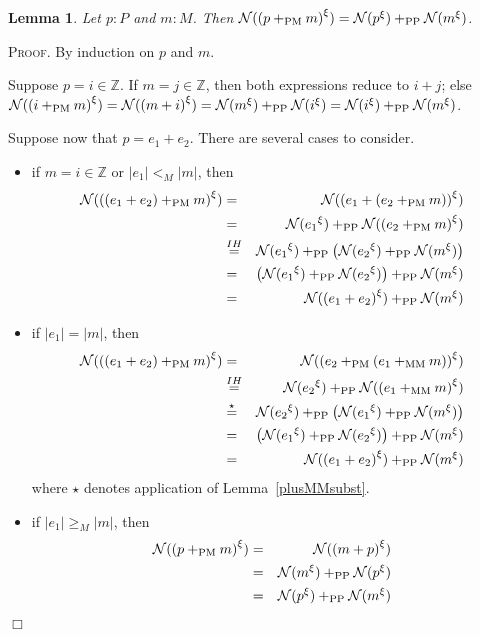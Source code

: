 \documentclass{article}
\newtheorem{lemma}[definition]{Lemma}
\newenvironment{proof}{\smallskip\textsc{Proof.}}{\hspace*{\fill}$\Box$}
\newcommand{\N}{{\cal N}}
\newcommand{\Z}{{\mathbb Z}}
\newcommand{\renamevar}[2]{\ensuremath{{#1}^{#2}}}
\newcommand{\plusMM}{\ensuremath{+_{\mathrm{MM}}}}
\newcommand{\plusPM}{\ensuremath{+_{\mathrm{PM}}}}
\newcommand{\plusPP}{\ensuremath{+_{\mathrm{PP}}}}
\begin{document}
\begin{lemma}\label{plusPMsubst} Let $p:P$ and $m:M$.  Then
$\N(\renamevar{(p\plusPM m)}\xi)%
=\N(\renamevar p\xi)\plusPP\N(\renamevar m\xi)$.
\end{lemma}
\begin{proof}
By induction on $p$ and $m$.

Suppose $p=i\in\Z$.  If $m=j\in\Z$, then both expressions reduce to $i+j$;
else
$\N(\renamevar{(i\plusPM m)}\xi)%
=\N(\renamevar{(m+i)}\xi)%
=\N(\renamevar m\xi)\plusPP\N(\renamevar i\xi)%
=\N(\renamevar i\xi)\plusPP\N(\renamevar m\xi)$.

Suppose now that $p=e_1+e_2$.  There are several cases to consider.
\begin{itemize}
\item if $m=i\in\Z$ or $|e_1|<_M|m|$, then
\begin{eqnarray*}
\N(\renamevar{((e_1+e_2)\plusPM m)}\xi)
 & = & \N(\renamevar{(e_1+(e_2\plusPM m))}\xi) \\
 & = & \N(\renamevar{e_1}\xi)\plusPP\N(\renamevar{(e_2\plusPM m)}\xi) \\
 & \stackrel{IH}= & \N(\renamevar{e_1}\xi)\plusPP\left(%
   \N(\renamevar{e_2}\xi)\plusPP\N(\renamevar m\xi)\right) \\
 & = & \left(\N(\renamevar{e_1}\xi)\plusPP\N(\renamevar{e_2}\xi)\right)%
   \plusPP\N(\renamevar m\xi)\\
 & = & \N(\renamevar{(e_1+e_2)}\xi)\plusPP\N(\renamevar m\xi)
\end{eqnarray*}
\item if $|e_1|=|m|$, then
\begin{eqnarray*}
\N(\renamevar{((e_1+e_2)\plusPM m)}\xi)
 & = & \N(\renamevar{(e_2\plusPM(e_1\plusMM m))}\xi) \\
 & \stackrel{IH}= & \N(\renamevar{e_2}\xi)\plusPP%
   \N(\renamevar{(e_1\plusMM m)}\xi) \\
 & \stackrel{\star}= & \N(\renamevar{e_2}\xi)\plusPP\left(%
   \N(\renamevar{e_1}\xi)\plusPP\N(\renamevar m\xi)\right) \\
 & = & \left(\N(\renamevar{e_1}\xi)\plusPP\N(\renamevar{e_2}\xi)\right)\plusPP%
   \N(\renamevar m\xi) \\
 & = & \N(\renamevar{(e_1+e_2)}\xi)\plusPP\N(\renamevar m\xi)
\end{eqnarray*}
where $\star$ denotes application of Lemma~\ref{plusMMsubst}.
\item if $|e_1|\geq_M|m|$, then
\begin{eqnarray*}
\N(\renamevar{(p\plusPM m)}\xi)
 & = & \N(\renamevar{(m+p)}\xi) \\
 & = & \N(\renamevar m\xi)\plusPP\N(\renamevar p\xi) \\
 & = & \N(\renamevar p\xi)\plusPP\N(\renamevar m\xi)
\end{eqnarray*}
\end{itemize}
\end{proof}
\end{document}
